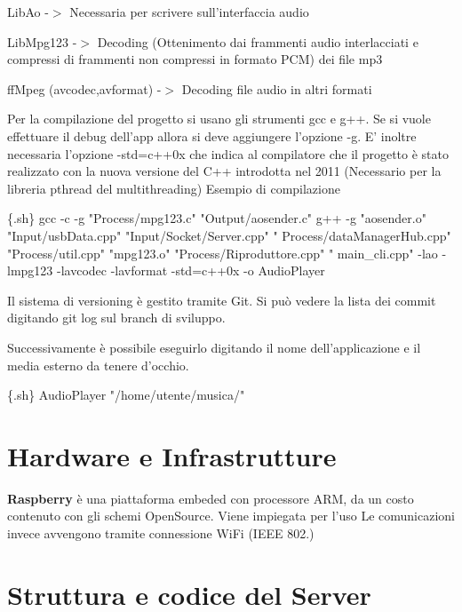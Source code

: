 \begin{DoxyItemize}
\item \-Lib\-Ao -\/$>$ \-Necessaria per scrivere sull'interfaccia audio
\item \-Lib\-Mpg123 -\/$>$ \-Decoding (\-Ottenimento dai frammenti audio interlacciati e compressi di frammenti non compressi in formato \-P\-C\-M) dei file mp3
\item ff\-Mpeg (avcodec,avformat) -\/$>$ \-Decoding file audio in altri formati \par
 \-Per la compilazione del progetto si usano gli strumenti gcc e g++. \-Se si vuole effettuare il debug dell'app allora si deve aggiungere l'opzione -\/g. \-E' inoltre necessaria l'opzione -\/std=c++0x che indica al compilatore che il progetto è stato realizzato con la nuova versione del \-C++ introdotta nel 2011 (\-Necessario per la libreria pthread del multithreading) \-Esempio di compilazione 
\begin{DoxyCode}
 \{.sh\}
 gcc -c -g \textcolor{stringliteral}{"Process/mpg123.c"} \textcolor{stringliteral}{"Output/aosender.c"}
 g++ -g \textcolor{stringliteral}{"aosender.o"} \textcolor{stringliteral}{"Input/usbData.cpp"} \textcolor{stringliteral}{"Input/Socket/Server.cpp"} \textcolor{stringliteral}{"
      Process/dataManagerHub.cpp"} \textcolor{stringliteral}{"Process/util.cpp"} \textcolor{stringliteral}{"mpg123.o"} \textcolor{stringliteral}{"Process/Riproduttore.cpp"} \textcolor{stringliteral}{"
      main\_cli.cpp"} -lao -lmpg123  -lavcodec -lavformat -std=c++0x -o AudioPlayer
\end{DoxyCode}
 \par
 \-Il sistema di versioning è gestito tramite \-Git. \-Si può vedere la lista dei commit digitando git log sul branch di sviluppo. \par
 \-Successivamente è possibile eseguirlo digitando il nome dell'applicazione e il media esterno da tenere d'occhio. 
\begin{DoxyCode}
 \{.sh\} AudioPlayer \textcolor{stringliteral}{"/home/utente/musica/"} 
\end{DoxyCode}
 
\end{DoxyItemize}\hypertarget{index_hardware}{}\section{\-Hardware e Infrastrutture}\label{index_hardware}
{\bfseries \-Raspberry} è una piattaforma embeded con processore \-A\-R\-M, da un costo contenuto con gli schemi \-Open\-Source. \-Viene impiegata per l'uso \-Le comunicazioni invece avvengono tramite connessione \-Wi\-Fi (\-I\-E\-E\-E 802.) \hypertarget{index_serverStruct}{}\section{\-Struttura e codice del Server}\label{index_serverStruct}
